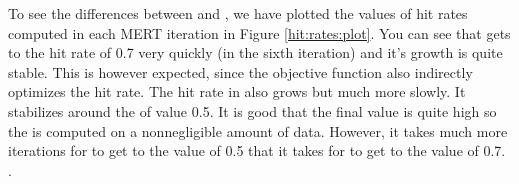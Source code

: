 To see the differences between  and
, we have plotted the values of hit rates computed in
each MERT iteration in Figure \ref{hit:rates:plot}. You can see that
 gets to the hit rate of 0.7 very quickly (in the sixth
iteration) and it's growth is quite stable. This is however expected, since the
objective function also indirectly optimizes the hit rate. The hit rate in
 also grows but much more slowly. It stabilizes around the of
value 0.5. It is good that the final value is quite high so the
 is computed on a nonnegligible amount of data. However, it
takes much more iterations for  to get to the value of 0.5 that
it takes for  to get to the value of 0.7. .




